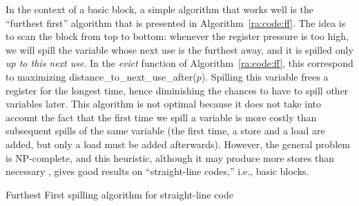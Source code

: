 {In the context of a basic block, a simple algorithm that works well is the ``furthest first'' algorithm that is presented in Algorithm~\ref{ra:code:ff}.
The idea is to scan the block from top to bottom:
whenever the register pressure is too high, we will spill the variable whose next use is the furthest away, and it is spilled only \emph{up to this next use}.
In the \textit{evict} function of Algorithm~\ref{ra:code:ff}, this correspond to maximizing \textrm{distance\_to\_next\_use\_after($p$)}.
%
Spilling this variable frees a register for the longest time, hence diminishing the chances to have to spill other variables later.
This algorithm is not optimal because it does not take into account the fact that the first time we spill a variable is more costly than subsequent spills of the same variable (the first time, a store and a load are added, but only a load must be added afterwards).
However, the general problem is NP-complete, and this heuristic, although it may produce more stores than necessary%
, gives good results on ``straight-line codes,'' i.e., basic blocks.

\begin{algorithm}[h]
  \caption{Furthest First spilling algorithm for straight-line code}
  \label{ra:code:ff}






\end{algorithm}

}
